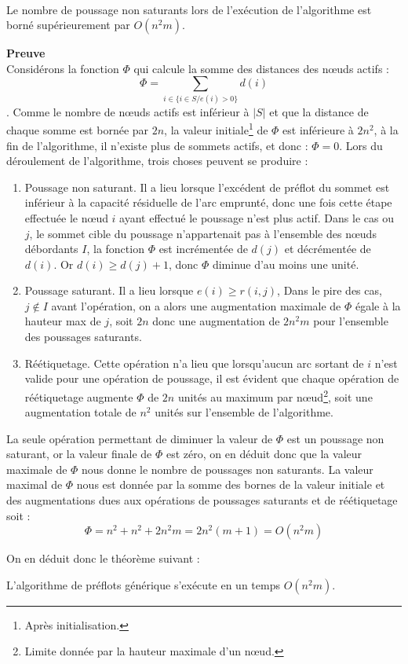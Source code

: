 \begin{lemma}~\\
	\label{borne_pns}
	Le nombre de poussage non saturants lors de l'exécution de l'algorithme est borné supérieurement
	par $O(n^2m)$.
\end{lemma}

\textbf{Preuve}\\
Considérons la fonction $\Phi$ qui calcule la somme des distances des n\oe uds actifs : $$
\Phi = \sum_{i \in \{i \in S / e(i) > 0\}} d(i)$$. Comme le nombre de n\oe uds actifs est inférieur à
$|S|$ et que la distance de chaque somme est bornée par $2n$, la valeur initiale\footnote{Après
initialisation.} de $\Phi$ est inférieure à $2n^2$, à la fin de l'algorithme, il n'existe plus de
sommets actifs, et donc : $\Phi = 0$.
Lors du déroulement de l'algorithme, trois choses peuvent se produire : \begin{enumerate}
	\item Poussage non saturant. Il a lieu lorsque l'excédent de préflot du sommet est inférieur à la
		capacité résiduelle de l'arc emprunté, donc une fois cette étape effectuée le n\oe ud $i$ ayant
		effectué le poussage n'est plus actif. Dans le cas ou $j$, le sommet cible du poussage
		n'appartenait pas à l'ensemble des n\oe uds débordants $I$, la fonction $\Phi$ est incrémentée de 
		$d(j)$ et décrémentée de $d(i)$.  Or $d(i) \geq d(j) + 1$, donc $\Phi$ diminue d'au moins une
		unité.
	\item Poussage saturant. Il a lieu lorsque $e(i) \geq r(i,j)$, Dans le pire des cas, $j \not
		\in I$ avant l'opération, on a alors une augmentation maximale de $\Phi$ égale à la hauteur max
		de $j$, soit $2n$ donc une augmentation de $2n^2m$ pour l'ensemble des poussages saturants.
	\item Réétiquetage. Cette opération n'a lieu que lorsqu'aucun arc sortant de $i$ n'est valide
		pour une opération de poussage, il est évident que chaque opération de réétiquetage augmente
		$\Phi$ de $2n$ unités au maximum par n\oe ud\footnote{Limite donnée par la hauteur maximale d'un
		n\oe ud.}, soit une augmentation totale de $n^2$ unités sur l'ensemble de l'algorithme.
\end{enumerate}

La seule opération permettant de diminuer la valeur de $\Phi$ est un poussage non saturant, or la
valeur finale de $\Phi$ est zéro, on en déduit donc que la valeur maximale de $\Phi$ nous donne le
nombre de poussages non saturants. La valeur maximal de $\Phi$ nous est donnée par la somme des
bornes de la valeur initiale et des augmentations dues aux opérations de poussages saturants et de
réétiquetage soit : $$
\Phi = n^2 + n^2 + 2n^2m = 2n^2 (m + 1) = O(n^2m) $$

On en déduit donc le théorème suivant :
\begin{thrm}
	L'algorithme de préflots générique s'exécute en un temps $O(n^2m)$.
\end{thrm}


